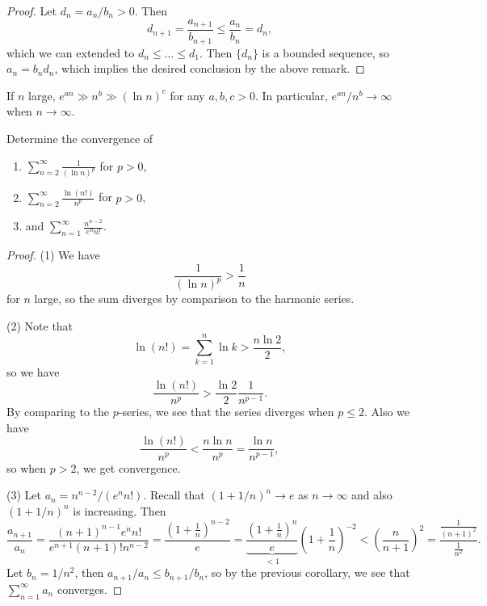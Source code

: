 \begin{proof}
  Let $d_n = a_n / b_n > 0$. Then
  \[
    d_{n + 1} = \frac{a_{n + 1}}{b_{n + 1}} \le \frac{a_n}{b_n} = d_n,
  \]
  which we can extended to $d_n \le \dots \le d_1$.
  Then $\{d_n\}$ is a bounded sequence, so
  $a_n = b_n d_n$, which implies the desired conclusion
  by the above remark.
\end{proof}

\begin{remark}
  If $n$ large, $e^{a n} \gg n^b \gg (\ln n)^c$
  for any $a, b, c > 0$. In particular,
  $e^{an} / n^b \to \infty$ when $n \to \infty$.
\end{remark}

\begin{example}
  Determine the convergence of
  \begin{enumerate}
    \item $\displaystyle \sum_{n = 2}^\infty \frac{1}{(\ln n)^p}$
      for $p > 0$,
    \item $\displaystyle \sum_{n = 2}^\infty \frac{\ln(n!)}{n^p}$ for $p > 0$,
    \item and $\displaystyle \sum_{n = 1}^\infty \frac{n^{n - 2}}{e^n n!}$.
  \end{enumerate}
\end{example}

\begin{proof}
  (1) We have
  \[
    \frac{1}{(\ln n)^p} > \frac{1}{n}
  \]
  for $n$ large, so the sum diverges by comparison to
  the harmonic series.

  (2) Note that
  \[
    \ln(n!) = \sum_{k = 1}^n \ln k > \frac{n \ln 2}{2},
  \]
  so we have
  \[
    \frac{\ln(n!)}{n^p} > \frac{\ln 2}{2} \frac{1}{n^{p - 1}}.
  \]
  By comparing to the $p$-series, we see that the
  series diverges when $p \le 2$. Also we have
  \[
    \frac{\ln(n!)}{n^p} < \frac{n \ln n}{n^p}
    = \frac{\ln n}{n^{p - 1}},
  \]
  so when $p > 2$, we get convergence.

  (3) Let $a_n = n^{n - 2} / (e^n n!)$. Recall that
  $(1 + 1 / n)^n \to e$ as $n \to \infty$ and also
  $(1 + 1 / n)^n$ is increasing. Then
  \[
    \frac{a_{n + 1}}{a_n}
    = \frac{(n + 1)^{n - 1} e^n n!}{e^{n + 1}(n + 1)! n^{n - 2}}
    = \frac{\left(1 + \frac{1}{n}\right)^{n - 2}}{e}
    = \underbrace{\frac{\left(1 + \frac{1}{n}\right)^n}{e}}_{< 1} \left(1 + \frac{1}{n}\right)^{-2}
    < \left(\frac{n}{n + 1}\right)^2 = \frac{\frac{1}{(n + 1)^2}}{\frac{1}{n^2}}.
  \]
  Let $b_n = 1 / n^2$, then $a_{n + 1} / a_n \le b_{n + 1} / b_n$,
  so by the previous corollary, we
  see that $\sum_{n = 1}^\infty a_n$ converges.
\end{proof}

